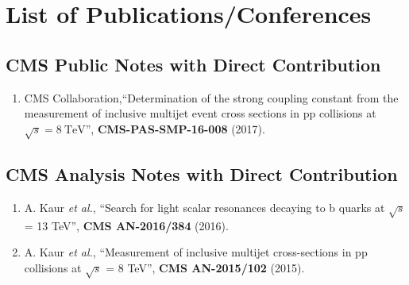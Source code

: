 \chapter*{List of Publications/Conferences} %
\markboth{}{}
\fontsize{11pt}{12pt} \selectfont
\section*{CMS Public Notes with Direct Contribution}

\begin{enumerate}

\item CMS Collaboration,``Determination of the strong coupling constant from the measurement of inclusive multijet event cross sections in pp collisions at $\sqrt{s} = 8~\mathrm{TeV}$'', {\bf CMS-PAS-SMP-16-008} (2017).

\end{enumerate}

\noindent\makebox[\textwidth]{\rule{\textwidth}{1pt}} 

\section*{CMS Analysis Notes with Direct Contribution}
\begin{enumerate}

\item A. Kaur {\it et al.}, ``Search for light scalar resonances decaying to b quarks at $\sqrt{s}$ = 13 TeV'', {\bf CMS AN-2016/384} (2016).

\item A. Kaur {\it et al.}, ``Measurement of inclusive multijet cross-sections in pp collisions at $\sqrt{s}$ = 8 TeV'', {\bf CMS AN-2015/102} (2015).

\end{enumerate}

\noindent\makebox[\textwidth]{\rule{\textwidth}{1pt}} 

